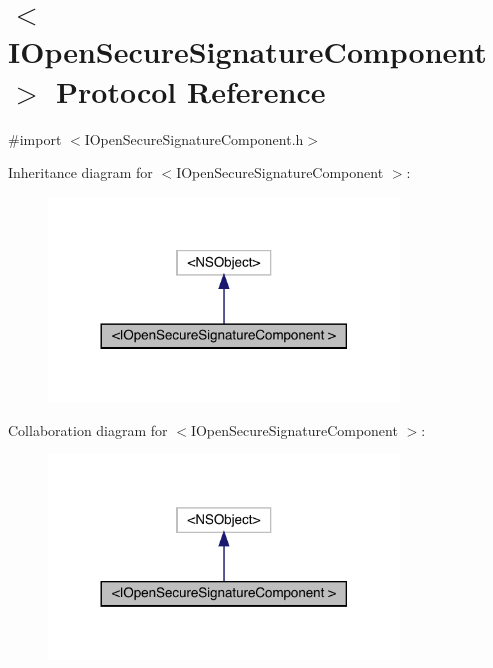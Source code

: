\hypertarget{protocol_i_open_secure_signature_component_01-p}{}\section{$<$I\+Open\+Secure\+Signature\+Component $>$ Protocol Reference}
\label{protocol_i_open_secure_signature_component_01-p}


{\ttfamily \#import $<$I\+Open\+Secure\+Signature\+Component.\+h$>$}



Inheritance diagram for $<$I\+Open\+Secure\+Signature\+Component $>$\+:\nopagebreak
\begin{figure}[H]
\begin{center}
\leavevmode
\includegraphics[width=264pt]{protocol_i_open_secure_signature_component_01-p__inherit__graph}
\end{center}
\end{figure}


Collaboration diagram for $<$I\+Open\+Secure\+Signature\+Component $>$\+:\nopagebreak
\begin{figure}[H]
\begin{center}
\leavevmode
\includegraphics[width=264pt]{protocol_i_open_secure_signature_component_01-p__coll__graph}
\end{center}
\end{figure}
